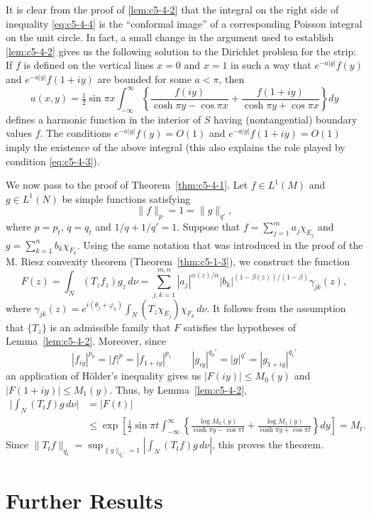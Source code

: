 It is clear from the proof of \eqref{lem:c5-4-2} that the integral on the right
side of inequality \eqref{eq:c5-4-4} is the ``conformal image'' of a
corresponding Poisson integral on the unit circle. In fact, a small change in
the argument used to establish \eqref{lem:c5-4-2} gives us the following
solution to the Dirichlet problem for the strip: If $f$ is defined on the
vertical lines $x = 0$ and $x = 1$ in such a way that $e^{-a|y|}f(y)$ and
$e^{-a|y|}f(1 + iy)$ are bounded for some $a < \pi$, then
\[
u(x,y)=\tfrac{1}{2}\sin\pi x\int_{-\infty}^{\infty}
\left\{\frac{f(iy)}{\cosh\pi y-\cos\pi x}
+\frac{f(1+iy)}{\cosh\pi y+\cos\pi x}\right\}dy
\]
defines a harmonic function in the interior of $S$ having (nontangential)
boundary values $f$. The conditions $e^{-a|y|}f(y) = O(1)$ and
$e^{-a|y|}f(1 + iy) = O(1)$ imply the existence of the above integral (this
also explains the role played by condition \eqref{eq:c5-4-3}).

We now pass to the proof of Theorem~\ref{thm:c5-4-1}. Let $f \in L^{1}(M)$ and
$g \in L^{1}(N)$ be simple functions satisfying
\[
\|f\|_{p}=1=\|g\|_{q'},
\]
where $p = p_{t}$, $q = q_{t}$ and $1/q + 1/q' = 1$. Suppose that
$f = \sum_{j=1}^{m}a_{j}\chi_{E_{j}}$ and
$g = \sum_{k=1}^{n}b_{k}\chi_{F_{k}}$. Using the same notation that was
introduced in the proof of the M. Riesz convexity theorem
(Theorem~\ref{thm:c5-1-3}), we construct the function
\[
F(z)=\int_{N}(T_{z}f_{z})g_{z}\,d\nu
=\sum_{j,k=1}^{m,n}|a_{j}|^{\alpha(z)/\alpha}|b_{k}|^{(1-\beta(z))/(1-\beta)}\gamma_{jk}(z),
\]
where
$\gamma_{jk}(z) = e^{i(\theta_{j} + \varphi_{k})}\int_{N}(T_{z}\chi_{E_{j}})\chi_{F_{k}}\,d\nu$.
It follows from the assumption that $\{T_{z}\}$ is an admissible family that
$F$ satisfies the hypotheses of Lemma~\ref{lem:c5-4-2}. Moreover, since
\[
|f_{iy}|^{p_{0}}=|f|^{p}=|f_{1+iy}|^{p_{1}}
\qquad
|g_{iy}|^{q_{0}'}=|g|^{q'}=|g_{1+iy}|^{q_{1}'}
\]
an application of H\"older's inequality gives us $|F(iy)| \leq M_{0}(y)$ and
$|F(1 + iy)| \leq M_{1}(y)$. Thus, by Lemma~\ref{lem:c5-4-2},
\begin{align*}
\bigg|\int_{N}(T_{t}f)g\,d\nu\bigg|&=|F(t)|\\
&\leq\exp\left[\tfrac{1}{2}\sin\pi t\int_{-\infty}^{\infty}
\left\{\frac{\log M_{0}(y)}{\cosh\pi y-\cos\pi t}
+\frac{\log M_{1}(y)}{\cosh\pi y+\cos\pi t}\right\}dy\right]=M_{t}.
\end{align*}
Since
$\|T_{t}f\|_{q_{t}} = \sup_{\|g\|_{q_{t}'} = 1}|\int_{N}(T_{t}f)g\,d\nu|$,
this proves the theorem.

\section{Further Results}

